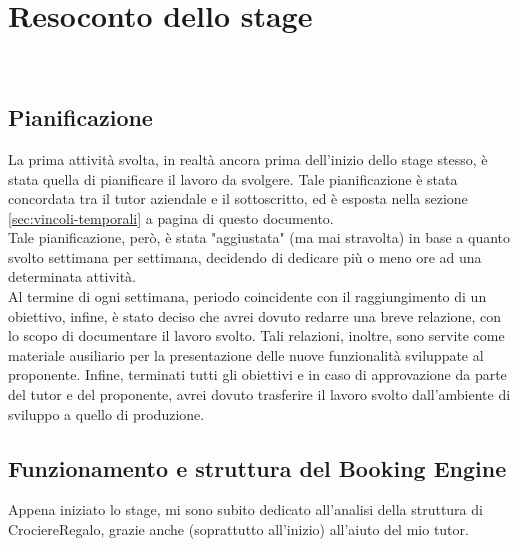 
\chapter{Resoconto dello stage}
\label{cap:resoconto-stage}

\\

\section{Pianificazione}
La prima attività svolta, in realtà ancora prima dell'inizio dello stage stesso, è stata quella di pianificare il lavoro da svolgere. Tale pianificazione è stata concordata tra il tutor aziendale e il sottoscritto, ed è esposta nella sezione \ref{sec:vincoli-temporali} a pagina \pageref{sec:vincoli-temporali} di questo documento.\\
Tale pianificazione, però, è stata "aggiustata" (ma mai stravolta) in base a quanto svolto settimana per settimana, decidendo di dedicare più o meno ore ad una determinata attività.\\
Al termine di ogni settimana, periodo coincidente con il raggiungimento di un obiettivo, infine, è stato deciso che avrei dovuto redarre una breve relazione, con lo scopo di documentare il lavoro svolto. Tali relazioni, inoltre, sono servite come materiale ausiliario per la presentazione delle nuove funzionalità sviluppate al proponente. Infine, terminati tutti gli obiettivi e in caso di approvazione da parte del tutor e del proponente, avrei dovuto trasferire il lavoro svolto dall'ambiente di sviluppo a quello di produzione.

\section{Funzionamento e struttura del Booking Engine}
Appena iniziato lo stage, mi sono subito dedicato all'analisi della struttura di CrociereRegalo, grazie anche (soprattutto all'inizio) all'aiuto del mio tutor. 
